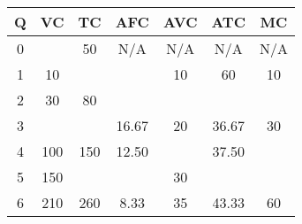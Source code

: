 \begin{table}[]
    \centering
    \begin{tabular}{ccccccc}
    \hline
    Q & VC  & TC  & AFC   & AVC & ATC   & MC  \\
    \hline
    0 &     & 50  & N/A   & N/A & N/A   & N/A  \\
    1 & 10  &     &       & 10  & 60    & 10  \\
    2 & 30  & 80  &       &     &       &   \\
    3 &     &     & 16.67 & 20  & 36.67 & 30  \\
    4 & 100 & 150 & 12.50 &     & 37.50 &   \\
    5 & 150 &     &       & 30  &       &   \\
    6 & 210 & 260 & 8.33  & 35  & 43.33 & 60  \\
    \hline
    \end{tabular}
\end{table}